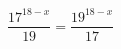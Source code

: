 \begin{ex}[type=equation]
	\begin{condition}
		\( \dfrac{17^{18-x}}{19}=\dfrac{19^{18-x}}{17} \)
	\end{condition}
\end{ex}